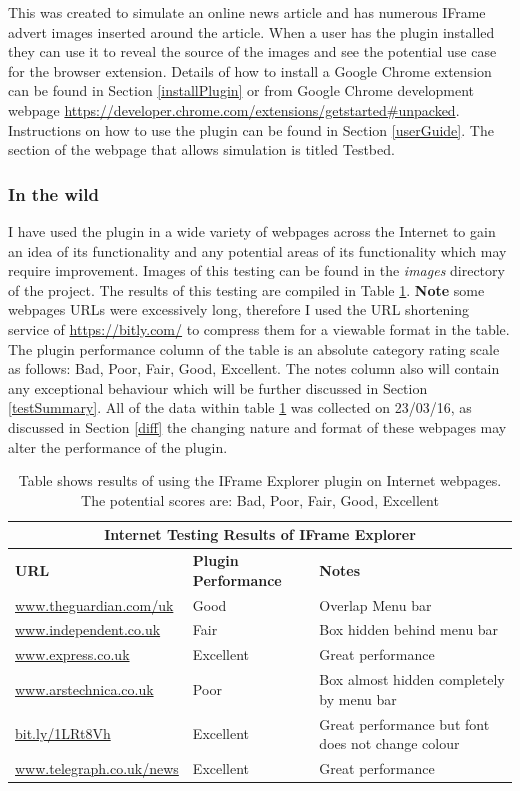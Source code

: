 \documentclass[12pt]{article}
\begin{document}
This was created to simulate an online news article and has numerous IFrame advert images inserted around the article. When a user has the plugin installed they can use it to reveal the source of the images and see the potential use case for the browser extension. Details of how to install a Google Chrome extension can be found in Section \ref{installPlugin} or from Google Chrome development webpage \url{https://developer.chrome.com/extensions/getstarted#unpacked}. Instructions on how to use the plugin can be found in Section \ref{userGuide}. The section of the webpage that allows simulation is titled Testbed. 

\subsubsection{In the wild} \label{ieWild}
I have used the plugin in a wide variety of webpages across the Internet to gain an idea of its functionality and any potential areas of its functionality which may require improvement. Images of this testing can be found in the \textit{images} directory of the project. The results of this testing are compiled in Table \ref{table:2}. \textbf{Note} some webpages URLs were excessively long, therefore I used the URL shortening service of \url{https://bitly.com/} to compress them for a viewable format in the table. The plugin performance column of the table is an absolute category rating scale as follows: Bad, Poor, Fair, Good, Excellent. The notes column also will contain any exceptional behaviour which will be further discussed in Section \ref{testSummary}. All of the data within table \ref{table:2} was collected on 23/03/16, as discussed in Section \ref{diff} the changing nature and format of these webpages may alter the performance of the plugin. \\

{
\begin{table} [H]
\centering
\begin{tabular}{ |p{5cm}|p{5cm}|p{5cm}|  }
\hline
\multicolumn{3}{|c|}{\textbf{Internet Testing Results of IFrame Explorer}} \\
\hline
\textbf{URL} & \textbf{Plugin Performance} & \textbf{Notes} \\
\hline
\url{www.theguardian.com/uk} & Good & Overlap Menu bar \\
\hline
\url{www.independent.co.uk} & Fair & Box hidden behind menu bar \\
\hline
\url{www.express.co.uk} & Excellent & Great performance \\
\hline
\url{www.arstechnica.co.uk} & Poor & Box almost hidden completely by menu bar  \\
\hline
\url{bit.ly/1LRt8Vh} & Excellent & Great performance but font does not change colour \\
\hline
\url{www.telegraph.co.uk/news} & Excellent & Great performance   \\
\hline
\end{tabular}
\caption{Table shows results of using the IFrame Explorer plugin on Internet webpages. The potential scores are: Bad, Poor, Fair, Good, Excellent}
\label{table:2}
\end{table}
}
\end{document}
